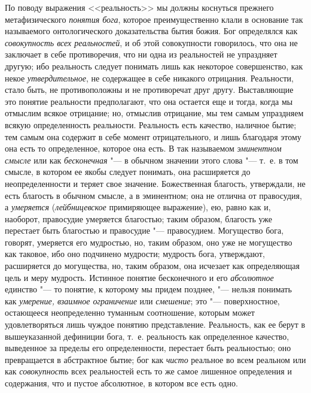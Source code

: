 По поводу выражения <<реальность>> мы должны коснуться прежнего
метафизического {\em понятия бога}, которое
преимущественно клали в основание так называемого онтологического
доказательства бытия божия. Бог определялся как
{\em совокупность всех реальностей}, и об этой
совокупности говорилось, что она не заключает в себе противоречия, что ни
одна из реальностей не упраздняет другую; ибо реальность следует понимать
лишь как некоторое совершенство, как некое
{\em утвердительное}, не содержащее в себе никакого
отрицания. Реальности, стало быть, не противоположны и не противоречат друг
другу.
\label{bkm:bm73b}
Выставляющие это понятие реальности предполагают, что она остается еще и
тогда, когда мы отмыслим всякое отрицание; но, отмыслив отрицание, мы тем
самым упраздняем всякую определенность реальности. Реальность есть
качество, наличное бытие; тем самым она содержит в себе момент
отрицательного, и лишь благодаря этому она есть то определенное, которое
она есть. В так называемом
{\em эминентном}
{\em смысле} или как
{\em бесконечная} "--- в обычном значении этого слова
"--- т.~е. в том смысле, в котором ее якобы следует понимать, она расширяется
до неопределенности и теряет свое значение. Божественная благость,
утверждали, не есть благость в обычном смысле, а в эминентном; она не
отлична от правосудия, а {\em умеряется}
({\em лейбницевское} примиряющее выражение), ею, равно
как и, наоборот, правосудие умеряется благостью; таким образом, благость
уже перестает быть благостью и правосудие "--- правосудием. Могущество бога,
говорят, умеряется его мудростью, но, таким образом, оно уже не могущество
как таковое, ибо оно подчинено мудрости; мудрость бога, утверждают,
расширяется до могущества, но, таким образом, она исчезает как определяющая
цель и меру мудрость. Истинное понятие бесконечного и его
{\em абсолютное} единство "--- то понятие, к которому мы
придем позднее, "--- нельзя понимать как {\em умерение,
взаимное ограничение} или {\em смешение}; это
"--- поверхностное, остающееся неопределенно туманным соотношение, которым
может удовлетворяться лишь чуждое понятию представление. Реальность, как ее
берут в вышеуказанной дефиниции бога, т.~е. реальность как определенное
качество, выведенное за пределы его определенности, перестает быть
реальностью; оно превращается в абстрактное бытие; бог как
{\em чисто} реальное во всем реальном или как {\em совокупность} всех
реальностей есть то же самое лишенное определения и
содержания, что и пустое абсолютное, в котором все есть одно.

